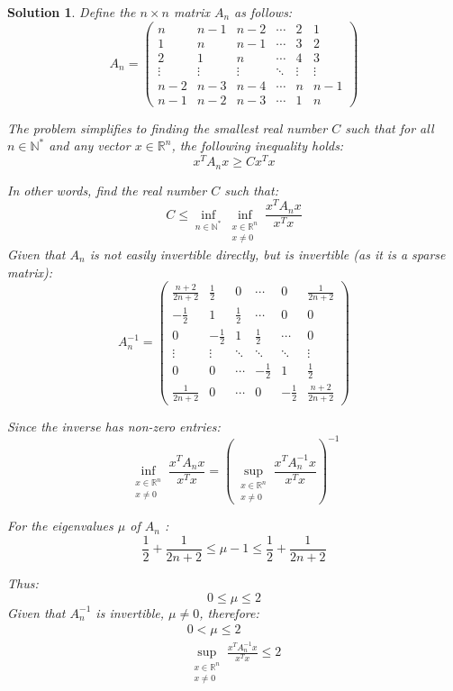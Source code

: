\documentclass[12pt]{article}
\newtheorem*{solution*}{Solution}
\begin{document}
\begin{solution*}
Define the $n \times n$ matrix $A_n$ as follows:
$$
A_n=\left(\begin{array}{cccccc}
n & n-1 & n-2 & \cdots & 2 & 1 \\
1 & n & n-1 & \cdots & 3 & 2 \\
2 & 1 & n & \cdots & 4 & 3 \\
\vdots & \vdots & \vdots & \ddots & \vdots & \vdots \\
n-2 & n-3 & n-4 & \cdots & n & n-1 \\
n-1 & n-2 & n-3 & \cdots & 1 & n
\end{array}\right)
$$

The problem simplifies to finding the smallest real number $C$ such that for all $n \in \mathbb{N}^*$ and any vector $x \in \mathbb{R}^n$, the following inequality holds:
$$
x^T A_n x \geq C x^T x
$$

In other words, find the real number $C$ such that:
$$
C \leq \inf _{n \in \mathbb{N}^*} \inf _{\substack{x \in \mathbb{R}^n \\ x \neq 0}} \frac{x^T A_n x}{x^T x}
$$
Given that $A_n$ is not easily invertible directly, but is invertible (as it is a sparse matrix):
$$
A_n^{-1}=\left(\begin{array}{cccccc}
\frac{n+2}{2 n+2} & \frac{1}{2} & 0 & \cdots & 0 & \frac{1}{2 n+2} \\
-\frac{1}{2} & 1 & \frac{1}{2} & \cdots & 0 & 0 \\
0 & -\frac{1}{2} & 1 & \frac{1}{2} & \cdots & 0 \\
\vdots & \vdots & \ddots & \ddots & \ddots & \vdots \\
0 & 0 & \cdots & -\frac{1}{2} & 1 & \frac{1}{2} \\
\frac{1}{2 n+2} & 0 & \cdots & 0 & -\frac{1}{2} & \frac{n+2}{2 n+2}
\end{array}\right)
$$

Since the inverse has non-zero entries:
$$
\inf _{\substack{x \in \mathbb{R}^n \\ x \neq 0}} \frac{x^T A_n x}{x^T x}=\left(\sup _{\substack{x \in \mathbb{R}^n \\ x \neq 0}} \frac{x^T A_n^{-1} x}{x^T x}\right)^{-1}
$$

For the eigenvalues $\mu$ of $A_n$ :
$$
\frac{1}{2}+\frac{1}{2 n+2} \leq \mu-1 \leq \frac{1}{2}+\frac{1}{2 n+2}
$$

Thus:
$$
0 \leq \mu \leq 2
$$
Given that $A_n^{-1}$ is invertible, $\mu \neq 0$, therefore:
$$
\begin{gathered}
0<\mu \leq 2 \\
\sup _{\substack{x \in \mathbb{R}^n \\
x \neq 0}} \frac{x^T A_n^{-1} x}{x^T x} \leq 2
\end{gathered}
$$


\end{solution*}
\end{document}
